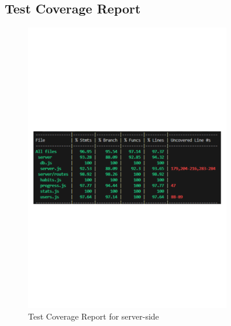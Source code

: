 \subsection{Test Coverage Report} \label{sect:test-coverage} 
\begin{figure}[H]
    \centering
    \includegraphics[width=0.8\textwidth]{resources/test_two.pdf}
    \caption{Test Coverage Report for server-side}
    \label{fig:test_coverage}
\end{figure}

